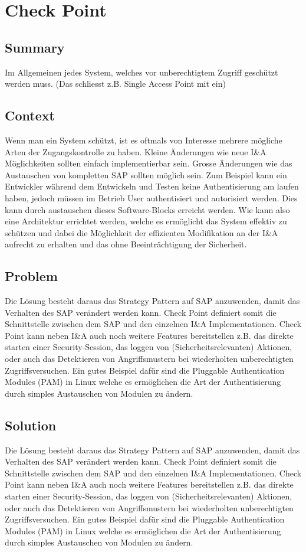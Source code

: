 \chapter{Check Point}

\section{Summary}
Im Allgemeinen jedes System, welches vor unberechtigtem Zugriff geschützt werden muss. (Das schliesst z.B. Single Access Point mit ein)

\section{Context}
Wenn man ein System schützt, ist es oftmals von Interesse mehrere mögliche Arten der Zugangskontrolle zu haben. Kleine Änderungen wie neue I\&A Möglichkeiten sollten einfach implementierbar sein. Grosse Änderungen wie das Austauschen von kompletten SAP sollten möglich sein. Zum Beispiel kann ein Entwickler während dem Entwickeln und Testen keine Authentisierung am laufen haben, jedoch müssen im Betrieb User authentisiert und autorisiert werden. Dies kann durch austauschen dieses Software-Blocks erreicht werden. Wie kann also eine Architektur errichtet werden, welche es ermöglicht das System effektiv zu schützen und dabei die Möglichkeit der effizienten Modifikation an der I\&A aufrecht zu erhalten und das ohne Beeinträchtigung der Sicherheit.

\section{Problem}
Die Lösung besteht daraus das Strategy Pattern auf SAP anzuwenden, damit das Verhalten des SAP verändert werden kann. Check Point definiert somit die Schnittstelle zwischen dem SAP und den einzelnen I\&A Implementationen. Check Point kann neben I\&A auch noch weitere Features bereitstellen z.B. das direkte starten einer Security-Session, das loggen von (Sicherheitsrelevanten) Aktionen, oder auch das Detektieren von Angriffsmustern bei wiederholten unberechtigten Zugriffsversuchen. Ein gutes Beispiel dafür sind die Pluggable Authentication Modules (PAM) in Linux welche es ermöglichen die Art der Authentisierung durch simples Austauschen von Modulen zu ändern.

\section{Solution}
Die Lösung besteht daraus das Strategy Pattern auf SAP anzuwenden, damit das Verhalten des SAP verändert werden kann. Check Point definiert somit die Schnittstelle zwischen dem SAP und den einzelnen I\&A Implementationen. Check Point kann neben I\&A auch noch weitere Features bereitstellen z.B. das direkte starten einer Security-Session, das loggen von (Sicherheitsrelevanten) Aktionen, oder auch das Detektieren von Angriffsmustern bei wiederholten unberechtigten Zugriffsversuchen. Ein gutes Beispiel dafür sind die Pluggable Authentication Modules (PAM) in Linux welche es ermöglichen die Art der Authentisierung durch simples Austauschen von Modulen zu ändern.

